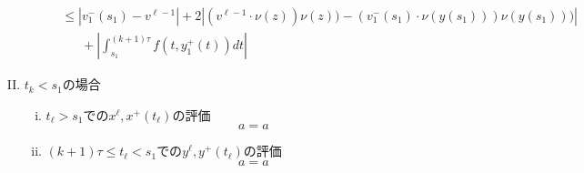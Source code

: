 \documentclass[a4,12pt]{article}
\begin{document}
\begin{enumerate}[(I).]
\begin{enumerate}[(i).]
\begin{align*}
                              &\le |v_1^-(s_1)-v^{\ell-1}|+2|(v^{\ell-1}\cdot\nu(z))\nu(z))-(v_1^-(s_1)\cdot\nu(y(s_1)))\nu(y(s_1)))|\\
                              &\ \ \ \ \ \ \ +|\int^{(k+1)\tau}_{s_1}f(t,y_1^+(t))dt|
            \end{align*}
    \end{enumerate}
    \item$t_k<s_1$の場合
    \begin{enumerate}[(i).]
        \item $t_\ell>s_1$での$x^\ell,x^+(t_\ell)$の評価\[a=a\]
        \item $(k+1)\tau\le t_\ell<s_1$での$y^\ell,y^+(t_\ell)$の評価\[a=a\]
    \end{enumerate}
\end{enumerate}
\end{document}
